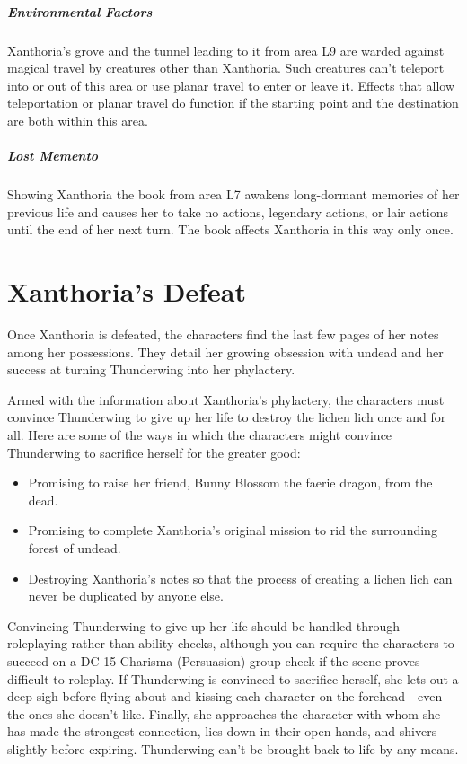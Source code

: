 \documentclass[10pt,a4paper,twoside,bg=print,twocolumn,openany,nodeprecatedcode]{dndbook}
\begin{document}
\subparagraph{Environmental Factors}
Xanthoria's grove and the tunnel leading to it from area L9 are warded against magical travel by creatures other than Xanthoria. Such creatures can't teleport into or out of this area or use planar travel to enter or leave it. Effects that allow teleportation or planar travel do function if the starting point and the destination are both within this area.

\subparagraph{Lost Memento}
Showing Xanthoria the book from area L7 awakens long-dormant memories of her previous life and causes her to take no actions, legendary actions, or lair actions until the end of her next turn. The book affects Xanthoria in this way only once.

\section{Xanthoria's Defeat}
Once Xanthoria is defeated, the characters find the last few pages of her notes among her possessions. They detail her growing obsession with undead and her success at turning Thunderwing into her phylactery.

Armed with the information about Xanthoria's phylactery, the characters must convince Thunderwing to give up her life to destroy the lichen lich once and for all. Here are some of the ways in which the characters might convince Thunderwing to sacrifice herself for the greater good:


\begin{itemize}
\item Promising to raise her friend, Bunny Blossom the faerie dragon, from the dead.
\item Promising to complete Xanthoria's original mission to rid the surrounding forest of undead.
\item Destroying Xanthoria's notes so that the process of creating a lichen lich can never be duplicated by anyone else.
\end{itemize}

Convincing Thunderwing to give up her life should be handled through roleplaying rather than ability checks, although you can require the characters to succeed on a DC 15 Charisma (Persuasion) group check if the scene proves difficult to roleplay. If Thunderwing is convinced to sacrifice herself, she lets out a deep sigh before flying about and kissing each character on the forehead—even the ones she doesn't like. Finally, she approaches the character with whom she has made the strongest connection, lies down in their open hands, and shivers slightly before expiring. Thunderwing can't be brought back to life by any means.
\end{document}
